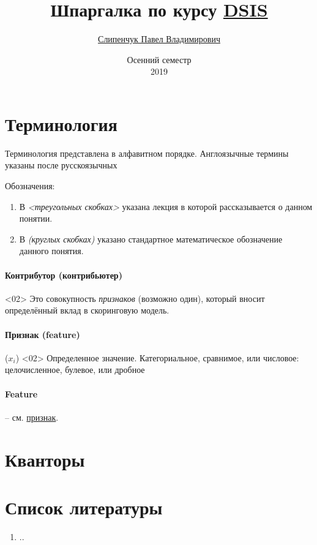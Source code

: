 \documentclass[russian,english,16pt]{article}
\title{Шпаргалка по курсу \href{https://github.com/kib-courses/dsis}{DSIS}}
\date{Осенний семестр\\ 2019}
\author{\href{mailto:pavelmstu@stego.su}{Слипенчук Павел Владимирович}}
\newcommand{\term}{\textit}
\begin{document}
\maketitle

\section{Терминология}

Терминология представлена в алфавитном порядке. Англоязычные термины указаны после русскоязычных 

Обозначения:
\begin{enumerate}
	\item В \textit{<треугольных скобках>} указана лекция в которой рассказывается о данном понятии.
	\item В \textit{(круглых скобках)} указано стандартное математическое обозначение
	данного понятия.
\end{enumerate}



\paragraph{Контрибутор (контрибьютер)}
<02>
Это совокупность \term{признаков} (возможно один), который вносит определённый вклад в скоринговую модель.

\paragraph{Признак (feature)}\label{ru_feature}
($x_i$) <02>
Определенное значение. Категориальное, сравнимое, или числовое: целочисленное, булевое, или дробное

\paragraph{Feature} -- см. \hyperref[ru_feature]{признак}.

\section{Кванторы}

\section{Список литературы}
\begin{enumerate}
  \item ..
\end{enumerate}



% 
% 
\end{document}
